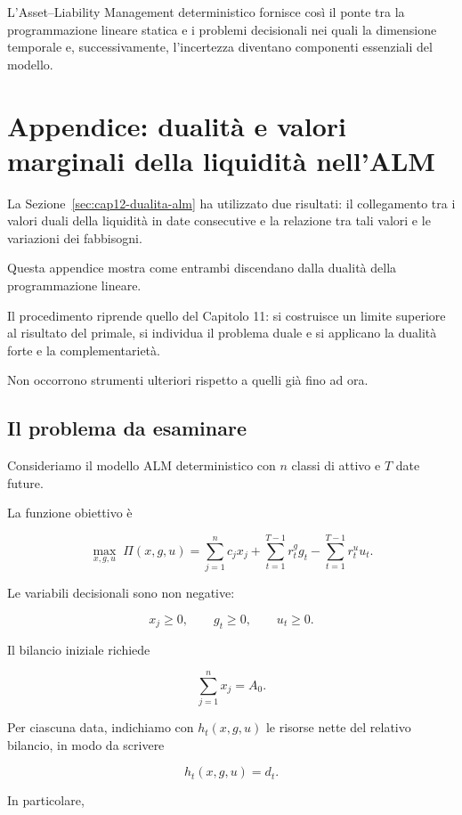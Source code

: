 L'Asset--Liability Management deterministico fornisce cos\`i il ponte tra la
programmazione lineare statica e i problemi decisionali nei quali la
dimensione temporale e, successivamente, l'incertezza diventano componenti
essenziali del modello.






\section{Appendice: dualit\`{a} e valori marginali
della liquidit\`{a} nell'ALM}

\label{sec:cap12-appendice-dualita}

La Sezione~\ref{sec:cap12-dualita-alm} ha utilizzato
due risultati: il collegamento tra i valori duali
della liquidit\`{a} in date consecutive e la relazione
tra tali valori e le variazioni dei fabbisogni.

Questa appendice mostra come entrambi discendano
dalla dualit\`{a} della programmazione lineare.

Il procedimento riprende quello del Capitolo 11:
si costruisce un limite superiore al risultato del
primale, si individua il problema duale e si applicano
la dualit\`{a} forte e la complementariet\`{a}.

Non occorrono strumenti ulteriori rispetto a quelli
gi\`{a} fino ad ora.

\subsection{Il problema da esaminare}

Consideriamo il modello ALM deterministico con
$n$ classi di attivo e $T$ date future.

La funzione obiettivo \`{e}

\[
\max_{x,g,u}\;
\Pi(x,g,u)
=
\sum_{j=1}^{n}c_jx_j
+
\sum_{t=1}^{T-1}r_t^gg_t
-
\sum_{t=1}^{T-1}r_t^uu_t.
\]

Le variabili decisionali sono non negative:

\[
x_j\geq0,\qquad
g_t\geq0,\qquad
u_t\geq0.
\]

Il bilancio iniziale richiede

\[
\sum_{j=1}^{n}x_j=A_0.
\]

Per ciascuna data, indichiamo con
$h_t(x,g,u)$ le risorse nette del relativo
bilancio, in modo da scrivere

\[
h_t(x,g,u)=d_t.
\]

In particolare,

